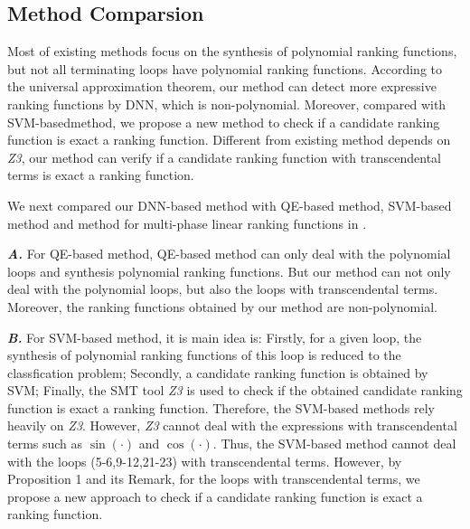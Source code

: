 \subsection{Method Comparsion}
\label{Method Comparsion}
Most of existing methods focus on the synthesis of polynomial ranking functions, but not all terminating loops have polynomial ranking functions. According to the universal approximation theorem, our method can detect more expressive ranking functions by DNN, which is non-polynomial. Moreover, compared with SVM-basedmethod, we propose a new method to check if a candidate ranking function is exact a ranking function. Different from existing method depends on \emph{Z3}, our method can verify if a candidate ranking function with transcendental terms is exact a ranking function.

We next compared our DNN-based method with QE-based method\cite{chen2007discovering}, SVM-based method \cite{yuan2019ranking} and method for multi-phase linear ranking functions in \cite{ben2017multiphase}.

\textbf{\emph{A.}} For QE-based method\cite{chen2007discovering}, QE-based method can only deal with the polynomial loops and synthesis polynomial ranking functions. But our method can not only deal with the polynomial loops, but also the loops with transcendental terms. Moreover, the ranking functions obtained by our method are non-polynomial.

\textbf{\emph{B.}} For SVM-based method\cite{yuan2019ranking}, it is main idea is: Firstly, for a given loop, the synthesis of polynomial ranking functions of this loop is reduced to the classfication problem; Secondly, a candidate ranking function is obtained by SVM; Finally, the SMT tool \emph{Z3} is used to check if the obtained candidate ranking function is exact a ranking function. Therefore, the SVM-based methods rely heavily on \emph{Z3}. However, \emph{Z3} cannot deal with the expressions with transcendental terms such as $\sin( \cdot )$ and $\cos(\cdot)$. Thus, the SVM-based method cannot deal with the loops (5-6,9-12,21-23) with transcendental terms. However, by Proposition 1 and its Remark, for the loops with transcendental terms, we propose a new approach to check if a candidate ranking function is exact a ranking function.

